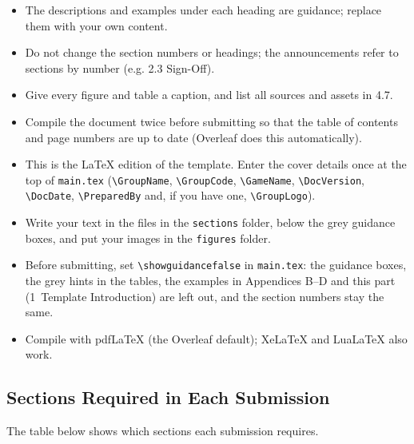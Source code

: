 \begin{itemize}[label=\textbullet]
  \item The descriptions and examples under each heading are guidance; replace them with your own content.
  \item Do not change the section numbers or headings; the announcements refer to sections by number (e.g. 2.3 Sign-Off).
  \item Give every figure and table a caption, and list all sources and assets in 4.7.
  \item Compile the document twice before submitting so that the table of contents and page numbers are up to date (Overleaf does this automatically).
  \item This is the LaTeX edition of the template. Enter the cover details once at the top of \texttt{main.tex} (\texttt{\textbackslash GroupName}, \texttt{\textbackslash GroupCode}, \texttt{\textbackslash GameName}, \texttt{\textbackslash DocVersion}, \texttt{\textbackslash DocDate}, \texttt{\textbackslash PreparedBy} and, if you have one, \texttt{\textbackslash GroupLogo}).
  \item Write your text in the files in the \texttt{sections} folder, below the grey guidance boxes, and put your images in the \texttt{figures} folder.
  \item Before submitting, set \texttt{\textbackslash showguidancefalse} in \texttt{main.tex}: the guidance boxes, the grey hints in the tables, the examples in Appendices B–D and this part (1~Template Introduction) are left out, and the section numbers stay the same.
  \item Compile with pdfLaTeX (the Overleaf default); XeLaTeX and LuaLaTeX also work.
\end{itemize}

\subsection{Sections Required in Each Submission}

The table below shows which sections each submission requires.

